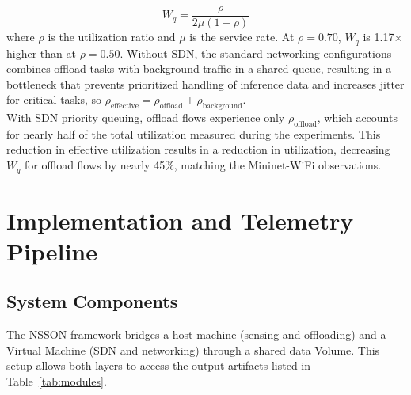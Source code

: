\documentclass[journal]{IEEEtran}
\begin{document}
\begin{equation}
W_q = \frac{\rho}{2\mu(1-\rho)}
\label{eq:queue}
\end{equation}
where $\rho$ is the utilization ratio and $\mu$ is the service rate.
At $\rho = 0.70$, $W_q$ is 1.17$\times$ higher than at $\rho = 0.50$.
Without SDN, the standard networking configurations combines offload tasks with background traffic in a shared queue, resulting in a bottleneck that prevents prioritized handling of inference data and increases jitter for critical tasks, so
$\rho_{\text{effective}} = \rho_{\text{offload}} + \rho_{\text{background}}$.
\\ With SDN priority queuing, offload flows experience only $\rho_{\text{offload}}$,
which accounts for nearly half of the total utilization measured during the experiments. This reduction in effective utilization results in a reduction in utilization, decreasing $W_q$ for offload flows by nearly 45\%, matching the Mininet-WiFi observations.

\section{Implementation and Telemetry Pipeline}
\label{sec:implementation}

\subsection{System Components}
The NSSON framework bridges a host machine (sensing and offloading) and a Virtual Machine (SDN and networking) through a shared data Volume. This setup allows both layers to access the output artifacts listed in Table~\ref{tab:modules}.
\end{document}
